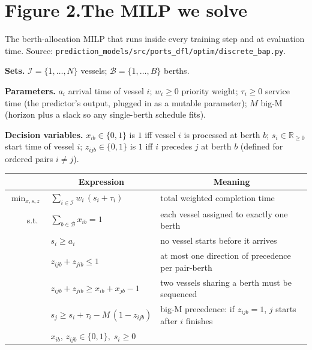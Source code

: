 \documentclass[11pt]{article}
\begin{document}
\newpage

\section*{Figure 2.\quad The MILP we solve}

\noindent
The berth-allocation MILP that runs inside every training step and at
evaluation time. Source:
\texttt{prediction\_models/src/ports\_dfl/optim/discrete\_bap.py}.

\vspace{0.5em}

\noindent\textbf{Sets.}
$\mathcal{I}=\{1,\dots,N\}$ vessels;\;
$\mathcal{B}=\{1,\dots,B\}$ berths.

\smallskip
\noindent\textbf{Parameters.}
$a_i$ arrival time of vessel $i$;\;
$w_i\geq 0$ priority weight;\;
$\tau_i\geq 0$ service time (the predictor's output, plugged in as a
mutable parameter);\;
$M$ big-M (horizon plus a slack so any single-berth schedule fits).

\smallskip
\noindent\textbf{Decision variables.}
$x_{ib}\in\{0,1\}$ is $1$ iff vessel $i$ is processed at berth $b$;\;
$s_i\in\mathbb{R}_{\geq 0}$ start time of vessel $i$;\;
$z_{ijb}\in\{0,1\}$ is $1$ iff $i$ precedes $j$ at berth $b$ (defined
for ordered pairs $i\neq j$).

\vspace{0.4em}

\begin{center}
\renewcommand{\arraystretch}{1.35}
\begin{tabular}{@{}r l l@{}}
\toprule
& \multicolumn{1}{c}{Expression} & \multicolumn{1}{c}{Meaning} \\
\midrule
$\displaystyle\min_{x,s,z}$ &
$\displaystyle\sum_{i\in\mathcal{I}} w_i\,(s_i + \tau_i)$ &
total weighted completion time \\
\midrule
s.t.\ &
$\displaystyle\sum_{b\in\mathcal{B}} x_{ib} = 1$ &
each vessel assigned to exactly one berth \\
&
$s_i \geq a_i$ &
no vessel starts before it arrives \\
&
$z_{ijb} + z_{jib} \leq 1$ &
at most one direction of precedence per pair-berth \\
&
$z_{ijb} + z_{jib} \geq x_{ib} + x_{jb} - 1$ &
two vessels sharing a berth must be sequenced \\
&
$s_j \geq s_i + \tau_i - M\,(1 - z_{ijb})$ &
big-M precedence: if $z_{ijb}{=}1$, $j$ starts after $i$ finishes \\
&
$x_{ib},\, z_{ijb} \in \{0,1\},\; s_i \geq 0$ & \\
\bottomrule
\end{tabular}
\end{center}
\end{document}
